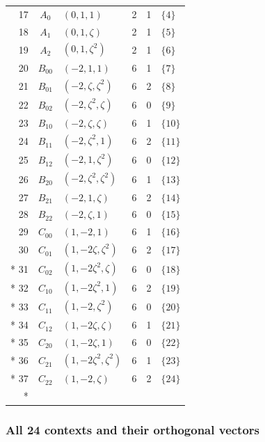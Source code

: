 \documentclass[aps,pra,reprint,superscriptaddress,longbibliography,nofootinbib,floatfix,10pt]{revtex4-2}
\theoremstyle{definition}
\begin{document}
\begin{longtable}{rclrrl}
17 & $A_{0}$ & $(0,1,1)$ & 2 & 1 & $\{4\}$ \\
18 & $A_{1}$ & $(0,1,\zeta)$ & 2 & 1 & $\{5\}$ \\
19 & $A_{2}$ & $(0,1,\zeta^2)$ & 2 & 1 & $\{6\}$ \\
20 & $B_{00}$ & $(-2,1,1)$ & 6 & 1 & $\{7\}$ \\
21 & $B_{01}$ & $(-2,\zeta,\zeta^2)$ & 6 & 2 & $\{8\}$ \\
22 & $B_{02}$ & $(-2,\zeta^2,\zeta)$ & 6 & 0 & $\{9\}$ \\
23 & $B_{10}$ & $(-2,\zeta,\zeta)$ & 6 & 1 & $\{10\}$ \\
24 & $B_{11}$ & $(-2,\zeta^2,1)$ & 6 & 2 & $\{11\}$ \\
25 & $B_{12}$ & $(-2,1,\zeta^2)$ & 6 & 0 & $\{12\}$ \\
26 & $B_{20}$ & $(-2,\zeta^2,\zeta^2)$ & 6 & 1 & $\{13\}$ \\
27 & $B_{21}$ & $(-2,1,\zeta)$ & 6 & 2 & $\{14\}$ \\
28 & $B_{22}$ & $(-2,\zeta,1)$ & 6 & 0 & $\{15\}$ \\
29 & $C_{00}$ & $(1,-2,1)$ & 6 & 1 & $\{16\}$ \\
30 & $C_{01}$ & $(1,-2\zeta,\zeta^2)$ & 6 & 2 & $\{17\}$ \\*
31 & $C_{02}$ & $(1,-2\zeta^2,\zeta)$ & 6 & 0 & $\{18\}$ \\*
32 & $C_{10}$ & $(1,-2\zeta^2,1)$ & 6 & 2 & $\{19\}$ \\*
33 & $C_{11}$ & $(1,-2,\zeta^2)$ & 6 & 0 & $\{20\}$ \\*
34 & $C_{12}$ & $(1,-2\zeta,\zeta)$ & 6 & 1 & $\{21\}$ \\*
35 & $C_{20}$ & $(1,-2\zeta,1)$ & 6 & 0 & $\{22\}$ \\*
36 & $C_{21}$ & $(1,-2\zeta^2,\zeta^2)$ & 6 & 1 & $\{23\}$ \\*
37 & $C_{22}$ & $(1,-2,\zeta)$ & 6 & 2 & $\{24\}$ \\*
\end{longtable}
\endgroup


\subsubsection{All 24 contexts and their orthogonal vectors}
\end{document}
